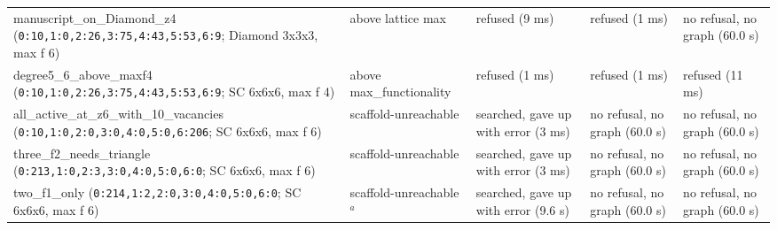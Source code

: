 \begin{longtable}{>{\raggedright\arraybackslash}p{4.6cm}>{\raggedright\arraybackslash}p{2.4cm}>{\raggedright\arraybackslash}p{2.7cm}>{\raggedright\arraybackslash}p{2.3cm}>{\raggedright\arraybackslash}p{2.3cm}}
manuscript\_\allowbreak{}on\_\allowbreak{}Diamond\_\allowbreak{}z4 (\texttt{0:10,\allowbreak{}1:0,\allowbreak{}2:26,\allowbreak{}3:75,\allowbreak{}4:43,\allowbreak{}5:53,\allowbreak{}6:9}; Diamond 3x3x3, max f 6) & above lattice max & refused (9 ms) & refused (1 ms) & no refusal, no graph (60.0 s) \\
degree5\_\allowbreak{}6\_\allowbreak{}above\_\allowbreak{}maxf4 (\texttt{0:10,\allowbreak{}1:0,\allowbreak{}2:26,\allowbreak{}3:75,\allowbreak{}4:43,\allowbreak{}5:53,\allowbreak{}6:9}; SC 6x6x6, max f 4) & above max\_\allowbreak{}functionality & refused (1 ms) & refused (1 ms) & refused (11 ms) \\
all\_\allowbreak{}active\_\allowbreak{}at\_\allowbreak{}z6\_\allowbreak{}with\_\allowbreak{}10\_\allowbreak{}vacancies (\texttt{0:10,\allowbreak{}1:0,\allowbreak{}2:0,\allowbreak{}3:0,\allowbreak{}4:0,\allowbreak{}5:0,\allowbreak{}6:206}; SC 6x6x6, max f 6) & scaffold-unreachable & searched, gave up with error (3 ms) & no refusal, no graph (60.0 s) & no refusal, no graph (60.0 s) \\
three\_\allowbreak{}f2\_\allowbreak{}needs\_\allowbreak{}triangle (\texttt{0:213,\allowbreak{}1:0,\allowbreak{}2:3,\allowbreak{}3:0,\allowbreak{}4:0,\allowbreak{}5:0,\allowbreak{}6:0}; SC 6x6x6, max f 6) & scaffold-unreachable & searched, gave up with error (3 ms) & no refusal, no graph (60.0 s) & no refusal, no graph (60.0 s) \\
two\_\allowbreak{}f1\_\allowbreak{}only (\texttt{0:214,\allowbreak{}1:2,\allowbreak{}2:0,\allowbreak{}3:0,\allowbreak{}4:0,\allowbreak{}5:0,\allowbreak{}6:0}; SC 6x6x6, max f 6) & scaffold-unreachable$^{a}$ & searched, gave up with error (9.6 s) & no refusal, no graph (60.0 s) & no refusal, no graph (60.0 s) \\
\end{longtable}
\vspace{-0.6\baselineskip}
\endgroup
